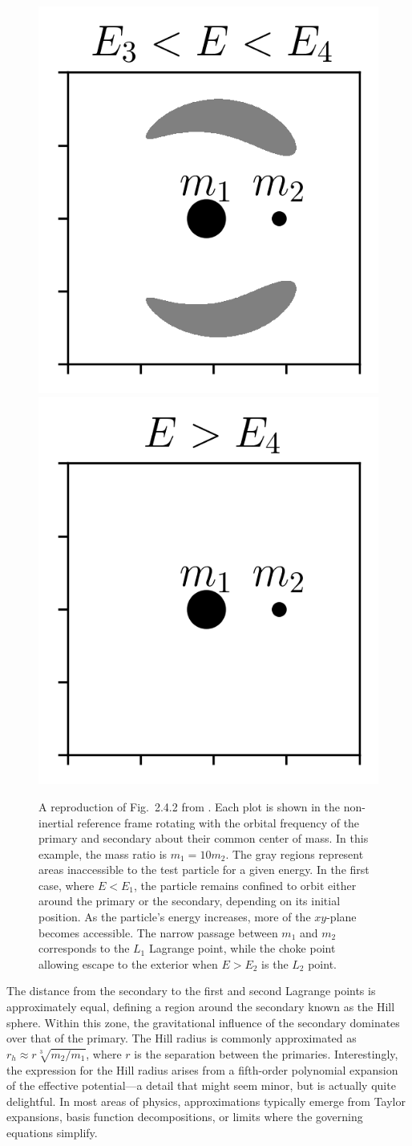 \begin{figure}
            \includegraphics[width=.32\linewidth]{images/CR3BP_forbidden_region_3.png}
            \includegraphics[width=.32\linewidth]{images/CR3BP_forbidden_region_4.png}
            \caption{A reproduction of Fig.~2.4.2 from \citet{koon2000dynamical}. Each plot is shown in the non-inertial reference frame rotating with the orbital frequency of the primary and secondary about their common center of mass. In this example, the mass ratio is \(m_1 = 10 m_2\). The gray regions represent areas inaccessible to the test particle for a given energy. In the first case, where \(E < E_1\), the particle remains confined to orbit either around the primary or the secondary, depending on its initial position. As the particle's energy increases, more of the \(xy\)-plane becomes accessible. The narrow passage between \(m_1\) and \(m_2\) corresponds to the \(L_1\) Lagrange point, while the choke point allowing escape to the exterior when \(E > E_2\) is the \(L_2\) point.}
            \label{fig:CR3BP_forbidden_region}
        \end{figure}

        The distance from the secondary to the first and second Lagrange points is approximately equal, defining a region around the secondary known as the Hill sphere. Within this zone, the gravitational influence of the secondary dominates over that of the primary. The Hill radius is commonly approximated as \( r_h \approx r\sqrt[3]{m_2/m_1} \), where \( r \) is the separation between the primaries. Interestingly, the expression for the Hill radius arises from a fifth-order polynomial expansion of the effective potential—a detail that might seem minor, but is actually quite delightful. In most areas of physics, approximations typically emerge from Taylor expansions, basis function decompositions, or limits where the governing equations simplify.

